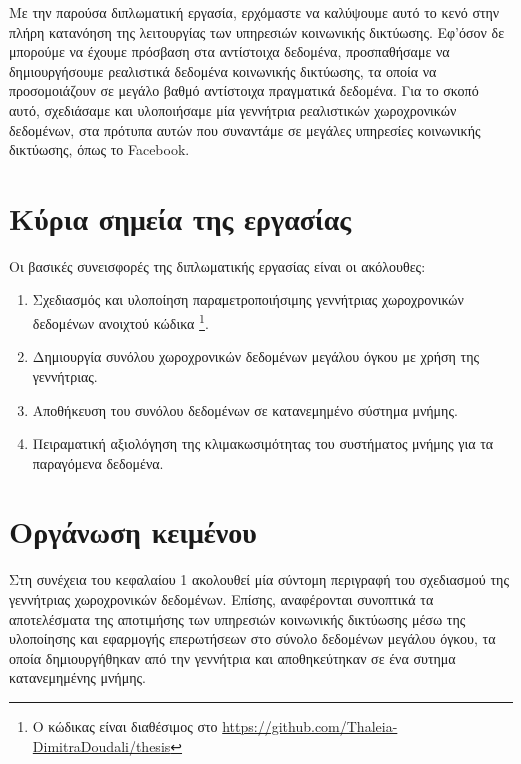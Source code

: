 Με την παρούσα διπλωματική εργασία, ερχόμαστε να καλύψουμε αυτό το κενό στην πλήρη κατανόηση της λειτουργίας των υπηρεσιών κοινωνικής δικτύωσης. 
Εφ'όσον δε μπορούμε να έχουμε πρόσβαση στα αντίστοιχα δεδομένα, προσπαθήσαμε να δημιουργήσουμε ρεαλιστικά \linebreak 
δεδομένα κοινωνικής δικτύωσης, τα οποία να προσομοιάζουν 
σε μεγάλο βαθμό αντίστοιχα \linebreak 
πραγματικά δεδομένα. Για το σκοπό αυτό, σχεδιάσαμε και υλοποιήσαμε μία γεννήτρια ρεαλιστικών χωροχρονικών δεδομένων, στα πρότυπα 
αυτών που συναντάμε σε μεγάλες υπηρεσίες κοινωνικής δικτύωσης, όπως το Facebook. 

\newpage

\section{Κύρια σημεία της εργασίας}

Οι βασικές συνεισφορές της διπλωματικής εργασίας είναι οι ακόλουθες:

\begin{enumerate}
 \item Σχεδιασμός και υλοποίηση παραμετροποιήσιμης γεννήτριας χωροχρονικών δεδομένων \linebreak ανοιχτού κώδικα \footnote{Ο κώδικας είναι διαθέσιμος στο 
 \url{https://github.com/Thaleia-DimitraDoudali/thesis}}.
 \item Δημιουργία συνόλου χωροχρονικών δεδομένων μεγάλου όγκου με χρήση της γεννήτριας.
 \item Αποθήκευση του συνόλου δεδομένων σε κατανεμημένο σύστημα μνήμης.
 \item Πειραματική αξιολόγηση της κλιμακωσιμότητας του συστήματος μνήμης για τα παραγόμενα δεδομένα.
\end{enumerate}

\section{Οργάνωση κειμένου}

Στη συνέχεια του κεφαλαίου 1 ακολουθεί μία σύντομη περιγραφή του σχεδιασμού της \linebreak γεννήτριας χωροχρονικών δεδομένων. Επίσης, αναφέρονται συνοπτικά τα 
αποτελέσματα της αποτιμήσης των υπηρεσιών κοινωνικής δικτύωσης μέσω της υλοποίησης και εφαρμογής \linebreak επερωτήσεων στο σύνολο δεδομένων μεγάλου όγκου, 
τα οποία δημιουργήθηκαν από την γεννήτρια και αποθηκεύτηκαν σε ένα συτημα κατανεμημένης μνήμης.

